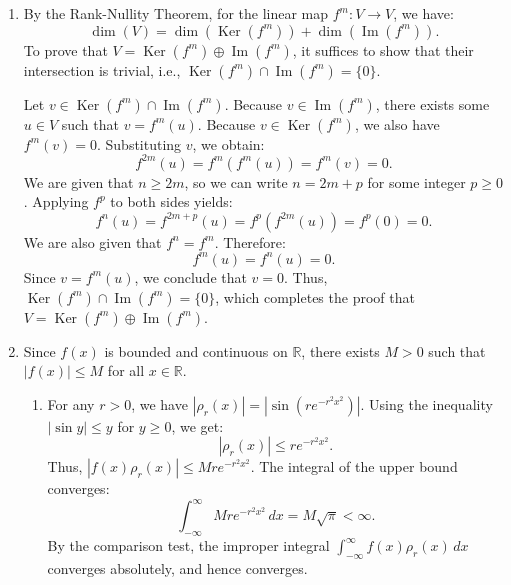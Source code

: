 \documentclass{article}
\begin{document}
\begin{enumerate}[label=\fbox{\arabic*}]
  \item %
        By the Rank-Nullity Theorem, for the linear map $f^m : V \to V$, we have:
        \[
          \dim(V) = \dim(\operatorname{Ker}(f^m)) + \dim(\operatorname{Im}(f^m)).
        \]
        To prove that $V = \operatorname{Ker}(f^m) \oplus \operatorname{Im}(f^m)$, it suffices to show that their intersection is trivial, i.e., $\operatorname{Ker}(f^m) \cap \operatorname{Im}(f^m) = \{0\}$.
        
        Let $v \in \operatorname{Ker}(f^m) \cap \operatorname{Im}(f^m)$.
        Because $v \in \operatorname{Im}(f^m)$, there exists some $u \in V$ such that $v = f^m(u)$.
        Because $v \in \operatorname{Ker}(f^m)$, we also have $f^m(v) = 0$.
        Substituting $v$, we obtain:
        \[
          f^{2m}(u) = f^m(f^m(u)) = f^m(v) = 0.
        \]
        We are given that $n \ge 2m$, so we can write $n = 2m + p$ for some integer $p \ge 0$.
        Applying $f^p$ to both sides yields:
        \[
          f^n(u) = f^{2m+p}(u) = f^p(f^{2m}(u)) = f^p(0) = 0.
        \]
        We are also given that $f^n = f^m$. Therefore:
        \[
          f^m(u) = f^n(u) = 0.
        \]
        Since $v = f^m(u)$, we conclude that $v = 0$.
        Thus, $\operatorname{Ker}(f^m) \cap \operatorname{Im}(f^m) = \{0\}$, which completes the proof that $V = \operatorname{Ker}(f^m) \oplus \operatorname{Im}(f^m)$.

  \item %
        Since $f(x)$ is bounded and continuous on $\mathbb{R}$, there exists $M > 0$ such that $|f(x)| \le M$ for all $x \in \mathbb{R}$.
        \begin{enumerate}[label=(\arabic*)]
          \item For any $r > 0$, we have $|\rho_r(x)| = |\sin(r e^{-r^2 x^2})|$. Using the inequality $|\sin y| \le y$ for $y \ge 0$, we get:
                \[
                  |\rho_r(x)| \le r e^{-r^2 x^2}.
                \]
                Thus, $|f(x)\rho_r(x)| \le M r e^{-r^2 x^2}$.
                The integral of the upper bound converges:
                \[
                  \int_{-\infty}^\infty M r e^{-r^2 x^2} \, dx = M \sqrt{\pi} < \infty.
                \]
                By the comparison test, the improper integral $\int_{-\infty}^\infty f(x) \rho_r(x) \, dx$ converges absolutely, and hence converges.
                

\end{enumerate}
\end{enumerate}
\end{document}
